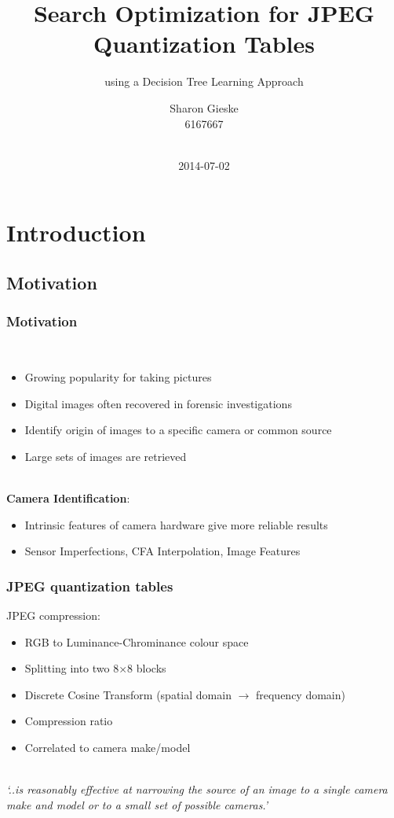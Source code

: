 \documentclass[10pt]{beamer}
\title{Search Optimization for JPEG Quantization Tables}
\subtitle{using a Decision Tree Learning Approach}
\author{Sharon Gieske\\6167667\\~\\}
\institute[UvA] %
{
Supervisors: Zeno Geradts (NFI)\\~\\
Master System and Network Engineering\\
University of Amsterdam \\
}
\date{2014-07-02} %
\begin{document}


\frame{
\maketitle
}

\section[Introduction]{Introduction}

\subsection{Motivation}
\begin{frame}
\frametitle{Motivation}~\\
\begin{itemize}
\item Growing popularity for taking pictures
\item Digital images often recovered in forensic investigations
\item Identify origin of images to a specific camera or common source
\item Large sets of images are retrieved
\end{itemize}
~\\
\textbf{Camera Identification}:
\begin{itemize}
\item Intrinsic features of camera hardware give more reliable results\cite{van2007survey}
\item Sensor Imperfections, CFA Interpolation, Image Features
\end{itemize} 
\end{frame}

\begin{frame}
\frametitle{JPEG quantization tables}
JPEG compression:
\begin{itemize}
\item RGB to Luminance-Chrominance colour space
\item Splitting into two 8$\times$8 blocks
\item Discrete Cosine Transform (spatial domain $\rightarrow$ frequency domain)
\item Compression ratio
\item Correlated to camera make/model
\end{itemize}
~\\
\textit{`..is reasonably effective at narrowing the source of an image to a single camera make and model or to
a small set of possible cameras.'}\cite{farid1}
\end{frame}
\end{document}
